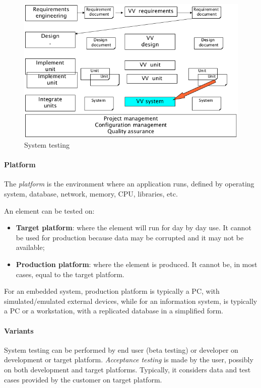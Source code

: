 \begin{figure}[hbtp]
\centering
\includegraphics[scale=0.35]{images/system_testing.png}
\caption{System testing}
\end{figure}

\paragraph{Platform} The \emph{platform} is the environment where an application runs, defined by operating system, database, network, memory, CPU, libraries, etc.

An element can be tested on:
\begin{itemize}
\item \textbf{Target platform}: where the element will run for day by day use. It cannot be used for production because data may be corrupted and it may not be available;
\item \textbf{Production platform}: where the element is produced. It cannot be, in most cases, equal to the target platform.
\end{itemize}
For an embedded system, production platform is typically a PC, with simulated/emulated external devices, while for an information system, is typically a PC or a workstation, with a replicated database in a simplified form.

\paragraph{Variants}
System testing can be performed by end user (beta testing) or developer on development or target platform. \emph{Acceptance testing} is made by the user, possibly on both development and target platforms. Typically, it considers data and test cases provided by the customer on target platform.

